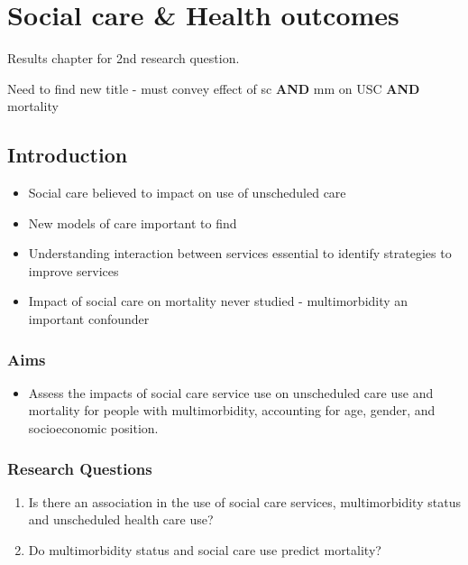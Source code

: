 \documentclass[12pt,]{report}
\begin{document}
\FloatBarrier

\FloatBarrier
\newpage
{}

\chapter{Social care \& Health outcomes}\label{ch:sc-outcomes}

Results chapter for 2nd research question.

Need to find new title - must convey effect of sc \textbf{AND} mm on USC
\textbf{AND} mortality

\section{Introduction}\label{sec:sc-outcomes-intro}

\begin{itemize}[noitemsep]
\item Social care believed to impact on use of unscheduled care
\item New models of care important to find
\item Understanding interaction between services essential to identify strategies to improve services
\item Impact of social care on mortality never studied - multimorbidity an important confounder
\end{itemize}

\subsection{Aims}\label{subsec:sc-outcomes-aims}

\begin{itemize}[noitemsep]
\item Assess the impacts of social care service use on unscheduled care use and mortality for people with multimorbidity, accounting for age, gender, and socioeconomic position.
\end{itemize}

\subsection{Research Questions}\label{subsec:sc-outcomes-rqs}

\begin{enumerate}[noitemsep]
\item Is there an association in the use of social care services, multimorbidity status and unscheduled health care use?
\item Do multimorbidity status and social care use predict mortality?
\end{enumerate}
\end{document}
